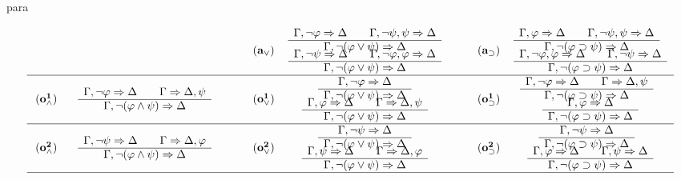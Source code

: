 \begin{entry}{para}
\begin{calculus}
\[\begin{tabular}{ccc@{\hspace{2em}}ccc@{\hspace{2em}}cc}
\vspace{-1.5em}
    & &&  &  $\drul{,\neg\vfi}{}{,\neg\psi,\psi}{}{,\neg     (\vfi\vee\psi)}{}$ && &  $\drul{,\vfi}{}{,\neg\psi,\psi}{}{,\neg    (\vfi\su\psi)}{}$ \ \  \\
\vspace{-1.5em}
\phantom{${\name{a_\wedge}}$ }
  & 
  \phantom{$\drul{,\neg \vfi}{}{,\neg\psi}{}{,\neg  (\vfi\w\psi)}{}$ }
  &&
 ${\name{a_\vee}}$ & &&   ${\name{a_\su}}$  & \ \ \\
  &&&&  $\drul{,\neg\psi}{}{,\neg\vfi,\vfi}{}{,\neg(\vfi\vee\psi)}{}$ &&   &    $\drul{,\neg\vfi,\vfi}{}{,\neg\psi}{}{,\neg      (\vfi\su\psi)}{}$ \\\hline

\vspace{-1.5em}
&&&&   $\srul{,\neg \vfi}{}{,\neg (\vfi\vee\psi)}{}$   &&& $\drul{,\neg \vfi}{}{}{,\psi}{,\neg (\vfi\su\psi)}{}$  \ \ \\
\vspace{-1.5em}
 ${\name{o^{1}_\w}}$ &  $\drul{,\neg \vfi}{}{}{,\psi}{,\neg (\vfi\w\psi)}{}$ && 
 ${\name{o^{1}_\vee}}$ &&& ${\name{o^{1}_\su}}$ & \ \ \\
 &&&&  $\drul{,\vfi}{}{}{,\psi}{,\neg (\vfi\vee\psi)}{}$ &&&
 $\srul{,\vfi}{}{,\neg (\vfi\su\psi)}{}$ \\\hline



\vspace{-1.5em}
&&&& $\srul{,\neg \psi}{}{,\neg (\vfi\vee\psi)}{}$ &&&   $\srul{,\neg \psi}{}{,\neg (\vfi\su\psi)}{}$ \ \ \\
\vspace{-1.5em}
 ${\name{o^{2}_\w}}$ &  $\drul{,\neg \psi}{}{}{,\vfi}{,\neg (\vfi\w\psi)}{}$ && 
 ${\name{o^{2}_\vee}}$ &&&
 ${\name{o^{2}_\su}}$ & \ \ \\
 &&&& $\drul{,\psi}{}{}{,\vfi}{,\neg (\vfi\vee\psi)}{}$ &&&$\drul{,\vfi}{}{,\psi}{}{,\neg (\vfi\su\psi)}{}$\\\hline



 \end{tabular}\]
\normalsize
\end{calculus}



\end{entry}
